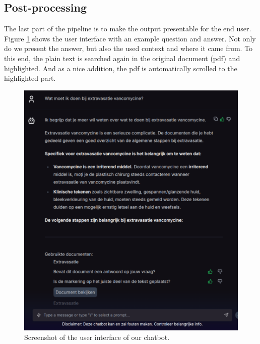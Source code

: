 \subsection{Post-processing}
The last part of the pipeline is to make the output presentable for the end user. Figure \ref{fig:chatbot_zenya} shows the user interface with an example question and answer. Not only do we present the answer, but also the used context and where it came from. To this end, the plain text is searched again in the original document (pdf) and highlighted. And as a nice addition, the pdf is automatically scrolled to the highlighted part. 

\begin{figure}[h]
    \centerline{\includegraphics[width=0.7\linewidth]{fig/chatbot_zenya.png}}
    \caption{Screenshot of the user interface of our chatbot.}
    \label{fig:chatbot_zenya}
\end{figure}

